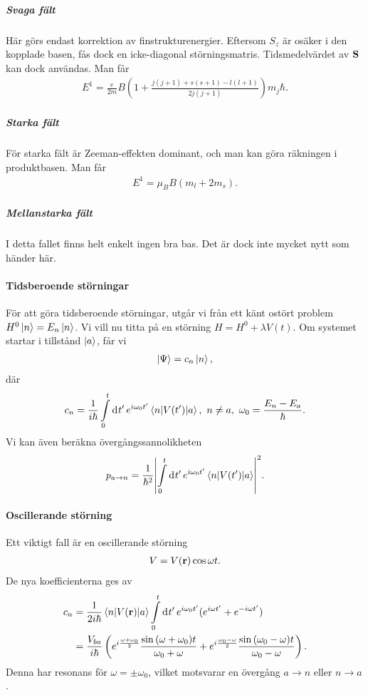 \subparagraph{Svaga fält}
Här görs endast korrektion av finstrukturenergier. Eftersom $S_{z}$ är osäker i den kopplade basen, fås dock en icke-diagonal störningsmatris. Tidsmedelvärdet av $\vb{S}$ kan dock användas. Man får
\begin{align*}
	E^{1} = \frac{e}{2m}B\left(1 + \frac{j(j + 1) + s(s + 1) - l(l + 1)}{2j(j + 1)}\right)m_{j}\hbar.
\end{align*}

\subparagraph{Starka fält}
För starka fält är Zeeman-effekten dominant, och man kan göra räkningen i produktbasen. Man får
\begin{align*}
	E^{1} = \mu_{B}B(m_{l} + 2m_{s}).
\end{align*}

\subparagraph{Mellanstarka fält}
I detta fallet finns helt enkelt ingen bra bas. Det är dock inte mycket nytt som händer här.

\paragraph{Tidsberoende störningar}
För att göra tidsberoende störningar, utgår vi från ett känt ostört problem $H^{0}\ket{n} = E_{n}\ket{n}$. Vi vill nu titta på en störning $H = H^{0} + \lambda V(t)$. Om systemet startar i tillstånd $\ket{a}$, får vi
\begin{align*}
	\ket{\Psi} = c_{n}\ket{n},
\end{align*}
där
\begin{align*}
	c_{n} = \frac{1}{i\hbar}\int\limits_{0}^{t}\dd[]{t'}e^{i\omega_{0}t'}\mel{n}{V(t')}{a},\ n \neq a,\ \omega_{0} = \frac{E_{n} - E_{a}}{\hbar}.
\end{align*}
Vi kan även beräkna övergångssannolikheten
\begin{align*}
	p_{a\to n} = \frac{1}{\hbar^{2}}\abs{\int\limits_{0}^{t}\dd[]{t'}e^{i\omega_{0}t'}\mel{n}{V(t')}{a}}^{2}.
\end{align*}

\paragraph{Oscillerande störning}
Ett viktigt fall är en oscillerande störning
\begin{align*}
	V = V(\vb{r})\cos{\omega t}.
\end{align*}
De nya koefficienterna ges av
\begin{align*}
	c_{n} &= \frac{1}{2i\hbar}\mel{n}{V(\vb{r})}{a}\int\limits_{0}^{t}\dd[]{t'}e^{i\omega_{0}t'}(e^{i\omega t'} + e^{-i\omega t'}) \\
	      &= \frac{V_{ba}}{i\hbar}\left(e^{i\frac{\omega + \omega_{0}}{2}}\frac{\sin{(\omega + \omega_{0})t}}{\omega_{0} + \omega} + e^{i\frac{\omega_{0} - \omega}{2}}\frac{\sin{(\omega_{0} - \omega)t}}{\omega_{0} - \omega}\right).
\end{align*}
Denna har resonans för $\omega = \pm\omega_{0}$, vilket motsvarar en övergång $a\to n$ eller $n\to a$.

